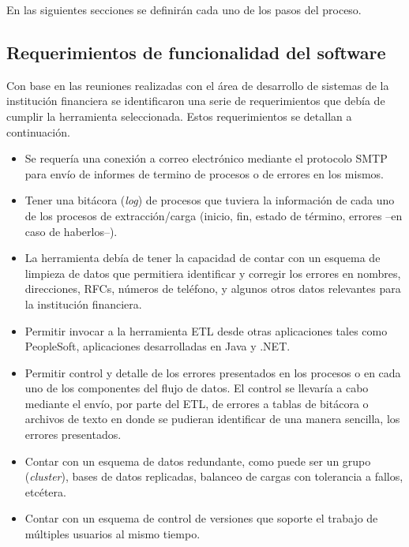 En las siguientes secciones se definirán cada uno de los pasos del proceso.

\subsection{Requerimientos de funcionalidad del software}

Con base en las reuniones realizadas con el área de desarrollo de sistemas de la
institución financiera se identificaron una serie de requerimientos que debía de cumplir la herramienta seleccionada.
Estos requerimientos se detallan a continuación.

\begin{itemize}

\item Se requería una conexión a correo electrónico mediante el protocolo SMTP
  para envío de informes de termino de procesos o de errores en los mismos.

\item Tener una bitácora (\emph{log}) de procesos que tuviera la información de
  cada uno de los procesos de extracción/carga (inicio, fin, estado de término,
  errores --en caso de haberlos--).

\item La herramienta debía de tener la capacidad de contar con un esquema de
  limpieza de datos que permitiera identificar y corregir los errores en
  nombres, direcciones, RFCs, números de teléfono, y algunos otros datos
  relevantes para la institución financiera.

\item Permitir invocar a la herramienta ETL desde otras aplicaciones tales como
  PeopleSoft, aplicaciones desarrolladas en Java y .NET.

\item Permitir control y detalle de los errores presentados en los procesos o en
  cada uno de los componentes del flujo de datos. El control se llevaría a cabo
  mediante el envío, por parte del ETL, de errores a tablas de bitácora o
  archivos de texto en donde se pudieran identificar de una manera sencilla, los
  errores presentados.

\item Contar con un esquema de datos redundante, como puede ser un grupo
  (\emph{cluster}), bases de datos replicadas, balanceo de cargas con tolerancia
  a fallos, etcétera.

\item Contar con un esquema de control de versiones que soporte el trabajo de
  múltiples usuarios al mismo tiempo.


\end{itemize}
